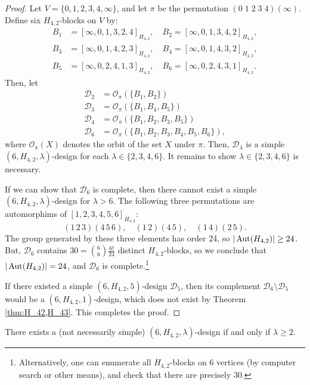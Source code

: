 \begin{proof}
Let $V = \{0,1,2,3,4,\infty\}$, and let $\pi$ be the permutation $(0 \; 1 \; 2 \; 3 \; 4)(\infty)$.
Define six $H_{4,2}$-blocks on $V$ by:
\begin{align*}
  B_1 &= [\infty, 0, 1, 3, 2, 4]_{H_{4,2}}, \quad
  B_2 = [\infty, 0, 1, 3, 4, 2]_{H_{4,2}}, \\
  B_3 &= [\infty, 0, 1, 4, 2, 3]_{H_{4,2}}, \quad
  B_4 = [\infty, 0, 1, 4, 3, 2]_{H_{4,2}}, \\
  B_5 &=  [\infty, 0, 2, 4, 1, 3]_{H_{4,2}}, \quad
  B_6 = [\infty, 0, 2, 4, 3, 1]_{H_{4,2}}.
\end{align*}
Then, let
\begin{align*}
  \mathcal{D}_2
  &= \mathcal{O}_\pi(\{B_1, B_2\}) \\
  \mathcal{D}_3
  &= \mathcal{O}_\pi(\{B_1, B_4, B_5\}) \\
  \mathcal{D}_4
  &= \mathcal{O}_\pi(\{B_1, B_2, B_3, B_5\}) \\
  \mathcal{D}_6
  &= \mathcal{O}_\pi(\{B_1, B_2, B_3, B_4, B_5, B_6\}),
\end{align*}
where $\mathcal{O}_\pi(X)$ denotes the orbit of the set $X$ under $\pi$.
Then, $\mathcal{D}_\lambda$ is a simple $(6, H_{4,2}, \lambda)$-design for each $\lambda \in \{2, 3, 4, 6\}$.
It remains to show $\lambda \in \{2, 3, 4, 6\}$ is necessary.

If we can show that $\mathcal{D}_6$ is complete, then there cannot exist a simple $(6, H_{4,2}, \lambda)$-design for $\lambda > 6$.
The following three permutations are automorphims of $[1, 2, 3, 4, 5, 6]_{H_{4,2}}$:
\[
  (1 \, 2 \, 3) (4 \, 5 \, 6), \quad (1 \, 2) (4 \, 5), \quad (1 \, 4) (2 \, 5).
\]
The group generated by these three elements has order 24, so $|\operatorname{Aut}(H_{4,2})| \geq 24$.
But, $\mathcal{D}_6$ contains $30 = {6 \choose 6} \frac{6!}{24}$ distinct $H_{4,2}$-blocks,
  so we conclude that $|\operatorname{Aut}(H_{4,2})| = 24$, and $\mathcal{D}_6$ is complete.\footnote{Alternatively,
  one can enumerate all $H_{4,2}$-blocks on 6 vertices (by computer search or other means), and check that there are precisely 30.}

If there existed a simple $(6, H_{4,2}, 5)$-design $\mathcal{D}_5$, then its complement
  $\mathcal{D}_6 \setminus \mathcal{D}_5$ would be a $(6, H_{4,2}, 1)$-design, which does not exist by Theorem \ref{thm:H_42,H_43}.
This completes the proof.
\end{proof}

\begin{theorem} \label{thm:H_42-6}
There exists a (not necessarily simple) $(6, H_{4,2}, \lambda)$-design if and only if $\lambda \geq 2$.
\end{theorem}

